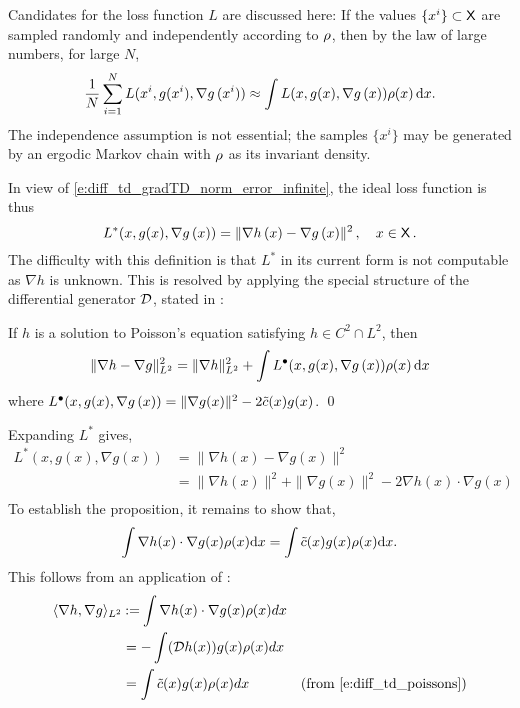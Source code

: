 Candidates for the loss function $L$ are discussed here: 
If the values $\{x^i\} \subset {\sf X} $  are sampled randomly and independently according to $\rho$,  then by the law of large numbers, for large $N$,
\begin{equation}
\frac{1}{N} \sum_{i=1}^N L(x^i, g(x^i), \nabla g\, (x^i))  \approx
\int  L(x, g(x), \nabla g\, (x))  \rho(x)\, \text{d} x.
\end{equation}
The independence assumption is not essential; the samples $\{x^i\}$ may be generated by an ergodic Markov chain with $\rho$ as its invariant density.

In view of \eqref{e:diff_td_gradTD_norm_error_infinite}, the ideal loss function is thus
\begin{equation}
L^*(x,g(x) ,\nabla g \,(x))  =         \| \nabla h\,(x)  -\nabla g\, (x) \|^2\,, \quad x\in\state\,.
\label{e:rkhs_IdealLoss}
\end{equation}
The difficulty with this definition is that $L^*$ in its current form is not computable as $\nabla h$ is unknown. This is resolved by applying the special structure of the differential generator ${\cal D}$,  stated in :
\begin{proposition}
	\label{prop:gradTD_erm_loss}
	If $h$ is a solution to Poisson's equation satisfying $h\in C^2\cap L^2$, then
	\[
	\| \nabla h -  \nabla g\|^2_{L^2} =\| \nabla h  \|^2_{L^2} + \int   L^\bullet(x, g(x), \nabla g\, (x)) \rho(x)\, \text{d} x
	\]
	where
	$ L^\bullet(x, g(x), \nabla g\, (x)) =   \| \nabla g(x)\|^2   - 2 \tilde c(x) g(x)$.
	\qed
\end{proposition}
Expanding $L^*$ gives,	
\[
\begin{aligned}
L^*(x,g(x),\nabla g(x)) & = \| \nabla h(x) - \nabla g(x) \|^2 \\
& = \| \nabla h(x) \|^2 + \| \nabla g(x) \|^2- 2 \nabla h(x) \cdot \nabla g(x) \\
\end{aligned}
\]
To establish the proposition, it remains to show that,
\[
\int \nabla h(x) \cdot \nabla g(x) \pr(x) \ud x = \int \tilc(x) g(x) \pr(x) \ud x.
\label{e:rkhs_transform}
\]
This follows from an application of :
\[
\begin{aligned}
\langle \nabla h, \nabla g \rangle_{L^2} & \mathbin{:=} \int \nabla h(x) \cdot \nabla g(x) \rho(x) dx \\
& = - \int  ({\cal D} h(x)) g(x) \rho(x) dx \\
& = \int \tilde c(x) g(x) \rho(x) dx \qquad & \text{(from \eqref{e:diff_td_poissons})}
\end{aligned}
\]
